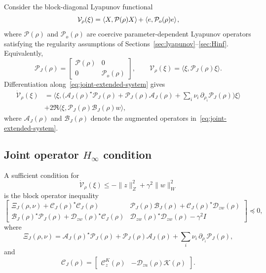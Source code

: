 \documentclass[AMA,Times2COL]{WileyNJDv5}
\newcommand{\preceqop}{\mathrel{\preccurlyeq}}
\newcommand{\ipX}[3][]{%
  \mathinner{\left\langle #2, #3 \right\rangle_{\!#1}}%
}
\begin{document}
Consider the block-diagonal Lyapunov functional
\[
\mathcal{V}_\rho(\xi)
=
\ipX{X}{\mathcal{P}(\rho)X}
+
\ipX{e}{\mathcal{P}_o(\rho)e},
\]
where $\mathcal{P}(\rho)$ and $\mathcal{P}_o(\rho)$ are coercive parameter-dependent Lyapunov operators satisfying the regularity assumptions of Sections~\ref{sec:lyapunov}--\ref{sec:Hinf}. Equivalently,
\[
\mathcal P_J(\rho)
=
\begin{bmatrix}
\mathcal P(\rho) & 0\\
0 & \mathcal P_o(\rho)
\end{bmatrix},
\qquad
\mathcal V_\rho(\xi)
=
\langle \xi,\mathcal P_J(\rho)\xi\rangle .
\]
Differentiation along~\eqref{eq:joint-extended-system} gives
\begin{align}
\dot{\mathcal V}_\rho(\xi)
&=
\big\langle \xi,
\big(
\mathcal A_J(\rho)^\star\mathcal P_J(\rho)
+
\mathcal P_J(\rho)\mathcal A_J(\rho)
+
\sum_i\nu_i\,\partial_{\rho_i}\mathcal P_J(\rho)
\big)\xi
\big\rangle\nonumber\\
&+
2\Re\langle \xi,\mathcal P_J(\rho)\mathcal B_J(\rho)w\rangle ,
\end{align}
where $\mathcal A_J(\rho)$ and $\mathcal B_J(\rho)$ denote the augmented operators in~\eqref{eq:joint-extended-system}.

\subsection{Joint operator \texorpdfstring{$H_\infty$}{H-infinity} condition}

A sufficient condition for
\[
\dot{\mathcal{V}}_\rho(\xi)
\le
-\|z\|_Z^2+\gamma^2\|w\|_W^2
\]
is the block operator inequality
\begin{equation}\label{eq:joint-ODLMI}
\begin{bmatrix}
\Xi_J(\rho,\nu)+\mathcal C_J(\rho)^\star\mathcal C_J(\rho)
&
\mathcal P_J(\rho)\mathcal B_J(\rho)
+
\mathcal C_J(\rho)^\star\mathcal D_{zw}(\rho)
\\[0.3em]
\mathcal B_J(\rho)^\star\mathcal P_J(\rho)
+
\mathcal D_{zw}(\rho)^\star\mathcal C_J(\rho)
&
\mathcal D_{zw}(\rho)^\star\mathcal D_{zw}(\rho)-\gamma^2 I
\end{bmatrix}
\preceqop 0,
\end{equation}
where
\[
\Xi_J(\rho,\nu)
=
\mathcal A_J(\rho)^\star\mathcal P_J(\rho)
+
\mathcal P_J(\rho)\mathcal A_J(\rho)
+
\sum_i\nu_i\,\partial_{\rho_i}\mathcal P_J(\rho),
\]
and
\[
\mathcal C_J(\rho)
=
\begin{bmatrix}
\mathcal C_z^K(\rho) & -\mathcal D_{zu}(\rho)\mathcal K(\rho)
\end{bmatrix}.
\]
\end{document}
